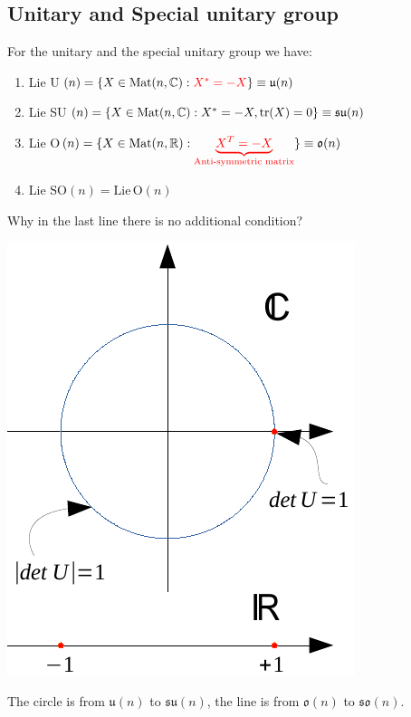 \documentclass[../main.tex]{subfiles}
\begin{document}
\subsection{Unitary and Special unitary group}
\begin{proposition}
For the unitary and the special unitary group we have:
\renewcommand{\labelenumi}{\Roman{enumi})}
\begin{enumerate}
\item Lie U$(n)=\{X\in\text{Mat}(n,\mathbb{C}):{\color{red}X^*=-X}\}\equiv\mathfrak{u}(n)$
\item Lie SU$(n)=\{X\in\text{Mat}(n,\mathbb{C}):X^*=-X, \tr(X)=0\}\equiv\mathfrak{su}(n)$
\item Lie O$(n)=\{X\in\text{Mat}(n,\mathbb{R}):{\color{red}\underbrace{X^T=-X}_{\textrm{Anti-symmetric matrix}}}\}\equiv\mathfrak{o}(n)$
\item Lie $\textrm{SO}(n)=\textrm{Lie}\, \textrm{O}(n)$
\end{enumerate}
\end{proposition}
Why in the last line there is no additional condition?
\begin{marginfigure}
    \includegraphics[width=1\linewidth]{images/u(n)su(n)o(n)so(n).pdf}
	\caption{The circle is from $\mathfrak{u}(n)$ to $\mathfrak{su}(n)$, the line is from $\mathfrak{o}(n)$ to $\mathfrak{so}(n)$.} %
\end{marginfigure}
\end{document}
